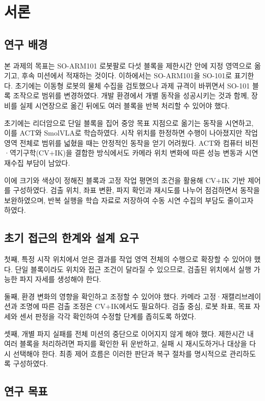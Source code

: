 \chapter{서론}
\section{연구 배경}
본 과제의 목표는 SO-ARM101 로봇팔로 다섯 블록을 제한시간 안에 지정 영역으로 옮기고, 후속 미션에서 적재하는 것이다. 이하에서는 SO-ARM101을 SO-101로 표기한다. 초기에는 이동형 로봇의 물체 수집을 검토했으나 과제 규격이 바뀌면서 SO-101 블록 조작으로 범위를 변경하였다. 개발 환경에서 개별 동작을 성공시키는 것과 함께, 장비를 실제 시연장으로 옮긴 뒤에도 여러 블록을 반복 처리할 수 있어야 했다.

초기에는 리더암으로 단일 블록을 집어 중앙 목표 지점으로 옮기는 동작을 시연하고, 이를 ACT와 SmolVLA로 학습하였다. 시작 위치를 한정하면 수행이 나아졌지만 작업 영역 전체로 범위를 넓혔을 때는 안정적인 동작을 얻기 어려웠다. ACT와 컴퓨터 비전·역기구학(CV+IK)을 결합한 방식에서도 카메라 위치 변화에 따른 성능 변동과 시연 재수집 부담이 남았다.

이에 크기와 색상이 정해진 블록과 고정 작업 평면의 조건을 활용해 CV+IK 기반 제어를 구성하였다. 검출 위치, 좌표 변환, 파지 확인과 재시도를 나누어 점검하면서 동작을 보완하였으며, 반복 실행을 학습 자료로 저장하여 수동 시연 수집의 부담도 줄이고자 하였다.

\section{초기 접근의 한계와 설계 요구}
첫째, 특정 시작 위치에서 얻은 결과를 작업 영역 전체의 수행으로 확장할 수 있어야 했다. 단일 블록이라도 위치와 접근 조건이 달라질 수 있으므로, 검출된 위치에서 실행 가능한 파지 자세를 생성해야 한다.

둘째, 환경 변화의 영향을 확인하고 조정할 수 있어야 했다. 카메라 고정·재캘리브레이션과 조명에 따른 검출 조정은 CV+IK에서도 필요하다. 검출 중심, 로봇 좌표, 목표 자세와 센서 판정을 각각 확인하여 수정할 단계를 좁히도록 하였다.

셋째, 개별 파지 실패를 전체 미션의 중단으로 이어지지 않게 해야 했다. 제한시간 내 여러 블록을 처리하려면 파지를 확인한 뒤 운반하고, 실패 시 재시도하거나 대상을 다시 선택해야 한다. 최종 제어 흐름은 이러한 판단과 복구 절차를 명시적으로 관리하도록 구성하였다.

\section{연구 목표}
